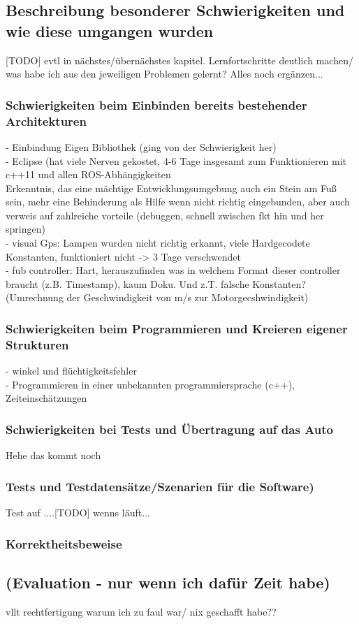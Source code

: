 \subsection{Beschreibung besonderer Schwierigkeiten und wie diese umgangen wurden}
[TODO] evtl in nächstes/übernächstes kapitel. Lernfortschritte deutlich machen/ was habe ich aus den jeweiligen Problemen gelernt? Alles noch ergänzen...

\subsubsection{Schwierigkeiten beim Einbinden bereits bestehender Architekturen}
 - Einbindung Eigen Bibliothek (ging von der Schwierigkeit her) \\
 - Eclipse (hat viele Nerven gekostet, 4-6 Tage insgesamt zum Funktionieren mit c++11 und allen ROS-Abhängigkeiten\\
 Erkenntnis, das eine mächtige Entwicklungsumgebung auch ein Stein am Fuß sein, mehr eine Behinderung als Hilfe wenn nicht richtig eingebunden, aber auch verweis auf zahlreiche vorteile (debuggen, schnell zwischen fkt hin und her springen)\\
 - visual Gps: Lampen wurden nicht richtig erkannt, viele Hardgecodete Konstanten, funktioniert nicht -> 3 Tage verschwendet\\
 - fub controller: Hart, herauszufinden was in welchem Format dieser controller braucht (z.B. Timestamp), kaum Doku. Und z.T. falsche Konstanten? (Umrechnung der Geschwindigkeit von m/s zur Motorgecshwindigkeit)
 
\subsubsection{Schwierigkeiten beim Programmieren und Kreieren eigener Strukturen}
- winkel und flüchtigkeitsfehler \\
- Programmieren in einer unbekannten programmiersprache (c++), Zeiteinschätzungen \\
\subsubsection{Schwierigkeiten bei Tests und Übertragung auf das Auto}
	Hehe das kommt noch
\subsubsection{Tests und Testdatensätze/Szenarien für die Software)}
Test auf ....[TODO] wenns läuft...
\subsubsection{Korrektheitsbeweise}
\subsection{(Evaluation - nur wenn ich dafür Zeit habe)}
vllt rechtfertigung warum ich zu faul war/ nix geschafft habe??